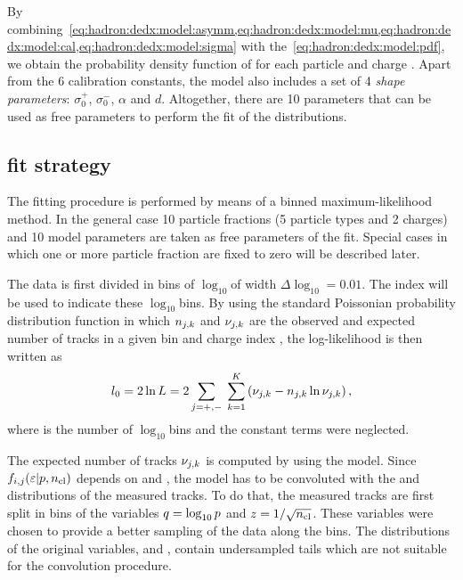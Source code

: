 By combining~\cref{eq:hadron:dedx:model:asymm,eq:hadron:dedx:model:mu,eq:hadron:dedx:model:cal,eq:hadron:dedx:model:sigma}
with the~\cref{eq:hadron:dedx:model:pdf}, we obtain the probability density
function of \eps for each particle \ipart and charge \ich.
Apart from the 6 calibration constants,
the model also includes a set of 4 \textit{shape parameters}: $\sigma_0^+$, $\sigma_0^-$, $\alpha$ and $d$.
Altogether, there are 10 parameters that can be used as free parameters
to perform the fit of the \eps distributions.


\subsection{\dedx fit strategy}
\label{sec:hadron:dedx:fit}


The fitting procedure is performed by means of a binned maximum-likelihood method.
In the general case 10 particle fractions (5 particle types and 2 charges) and
10 model parameters are taken as free parameters of the fit. Special cases
in which one or more particle fraction are fixed to zero will be described later.

The \eps data is first divided in bins of $\log_{10}$\eps of width $\Delta\log_{10}$\eps$=0.01$.
The index \ieps will be used to indicate these $\log_{10}$\eps bins.
By using the standard Poissonian probability distribution function in which
$n_{j,k}$ and $\nu_{j,k}$ are the observed and expected
number of tracks in a given bin \ieps and charge index \ich,
the log-likelihood is then written as
\begin{equation}
  l_0 = 2\ln L = 2\sum_{j=+,-}\;\sum_{k=1}^{K} \left(\nu_{j,k} - n_{j,k}\ln\nu_{j,k}\right), 
  \label{eq:hadron:dedx:fit:l0}
\end{equation}
where \neps is the number of $\log_{10}$\eps bins and the constant terms were neglected.

The expected number of tracks $\nu_{j,k}$ is computed by using
the \eps model. Since $f_{i,j}(\mbox{$\varepsilon$}|p,\mbox{$n_{\text{cl}}$})$ depends on \pp and \ncl,
the model has to be convoluted with the \pp and \ncl distributions
of the measured tracks.
To do that, the measured tracks are first split in
bins of the variables $q = \log_{10}p$ and $z = 1/\sqrt{\mbox{$n_{\text{cl}}$}}$.
These variables were chosen to provide a better sampling
of the data along the bins. The distributions of the
original variables, \pp and \ncl, contain undersampled
tails which are not suitable for the convolution procedure.

